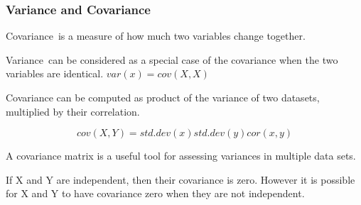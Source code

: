 
\begin{frame}
\frametitle{Variance and Covariance}
Covariance is a measure of how much two variables change together. 

Variance can be considered as a special case of the covariance when the two variables are identical.
$var(x) = cov(X,X)$

Covariance can be computed as product of the variance of two datasets, multiplied by their correlation.

\[
cov(X,Y) = std.dev (x) std.dev(y) cor(x,y)
\]

A covariance matrix is a useful tool for assessing variances in multiple data sets.


If X and Y are independent, then their covariance is zero. However it is possible for X and Y to have covariance zero when they are not independent.


\end{frame}
